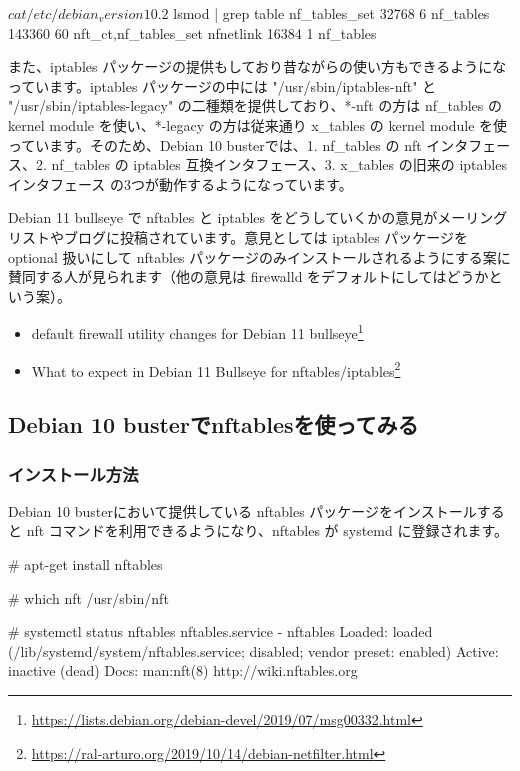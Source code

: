 \documentclass[mingoth,a4paper]{jsarticle}
\begin{document}
\begin{commandline}
$ cat /etc/debian_version
10.2
$ lsmod | grep table
nf_tables_set          32768  6
nf_tables             143360  60 nft_ct,nf_tables_set
nfnetlink              16384  1 nf_tables
\end{commandline}

また、iptables パッケージの提供もしており昔ながらの使い方もできるようになっています。iptables パッケージの中には "/usr/sbin/iptables-nft" と "/usr/sbin/iptables-legacy" の二種類を提供しており、*-nft の方は nf\_tables の kernel module を使い、*-legacy の方は従来通り x\_tables の kernel module を使っています。そのため、Debian 10 busterでは、1. nf\_tables の nft インタフェース、2. nf\_tables の iptables 互換インタフェース、3. x\_tables の旧来の iptables インタフェース の3つが動作するようになっています。

Debian 11 bullseye で nftables と iptables をどうしていくかの意見がメーリングリストやブログに投稿されています。意見としては iptables パッケージを optional 扱いにして nftables パッケージのみインストールされるようにする案に賛同する人が見られます（他の意見は firewalld をデフォルトにしてはどうかという案）。

\begin{itemize}
\item default firewall utility changes for Debian 11 bullseye\footnote{\url{https://lists.debian.org/debian-devel/2019/07/msg00332.html}}
\item What to expect in Debian 11 Bullseye for nftables/iptables\footnote{\url{https://ral-arturo.org/2019/10/14/debian-netfilter.html}}
\end{itemize}


\subsection{Debian 10 busterでnftablesを使ってみる}

\subsubsection{インストール方法}

Debian 10 busterにおいて提供している nftables パッケージをインストールすると nft コマンドを利用できるようになり、nftables が systemd に登録されます。

\begin{commandline}
# apt-get install nftables
  
# which nft
/usr/sbin/nft
  
# systemctl status nftables
nftables.service - nftables
  Loaded: loaded (/lib/systemd/system/nftables.service; disabled; vendor preset: enabled)
  Active: inactive (dead)
  Docs: man:nft(8)
  http://wiki.nftables.org
\end{commandline}
\end{document}
